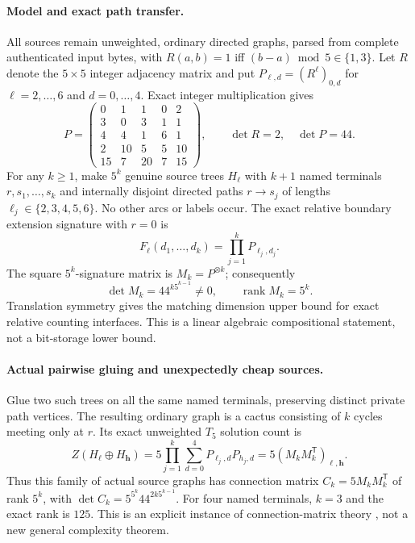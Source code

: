 \documentclass[11pt]{article}
\begin{document}
\paragraph{Model and exact path transfer.}
All sources remain unweighted, ordinary directed graphs, parsed from
complete authenticated input bytes, with
$R(a,b)=1$ iff $(b-a)\bmod5\in\{1,3\}$.
Let $R$ denote the $5\times5$ integer adjacency matrix and put
$P_{\ell,d}=(R^\ell)_{0,d}$ for $\ell=2,\ldots,6$ and
$d=0,\ldots,4$. Exact integer multiplication gives
\[
P=\begin{pmatrix}
0&1&1&0&2\\
3&0&3&1&1\\
4&4&1&6&1\\
2&10&5&5&10\\
15&7&20&7&15
\end{pmatrix},
\qquad \det R=2,\quad\det P=44.
\]
For any $k\ge1$, make $5^k$ genuine source trees $H_{\boldsymbol\ell}$
with $k+1$ named terminals $r,s_1,\ldots,s_k$ and internally
disjoint directed paths $r\to s_j$ of lengths
$\ell_j\in\{2,3,4,5,6\}$. No other arcs or labels occur.
The exact relative boundary extension signature with $r=0$ is
\[
F_{\boldsymbol\ell}(d_1,\ldots,d_k)
=\prod_{j=1}^k P_{\ell_j,d_j}.
\]
The square $5^k$-signature matrix is
$M_k=P^{\otimes k}$; consequently
\[
\det M_k=44^{k5^{k-1}}\ne0,\qquad
\operatorname{rank}M_k=5^k.
\]
Translation symmetry gives the matching dimension upper bound
for exact relative counting interfaces. This is a linear algebraic
compositional statement, not a bit-storage lower bound.

\paragraph{Actual pairwise gluing and unexpectedly cheap sources.}
Glue two such trees on all the same named terminals, preserving
distinct private path vertices. The resulting ordinary graph
is a cactus consisting of $k$ cycles meeting only at $r$. Its
exact unweighted $T_5$ solution count is
\[
Z(H_{\boldsymbol\ell}\oplus H_{\boldsymbol h})
=5\prod_{j=1}^k\sum_{d=0}^4
P_{\ell_j,d}P_{h_j,d}
=5(M_kM_k^{\mathsf T})_{\boldsymbol\ell,\boldsymbol h}.
\]
Thus this family of actual source graphs has connection matrix
$C_k=5M_kM_k^{\mathsf T}$ of rank $5^k$, with
$\det C_k=5^{5^k}44^{2k5^{k-1}}$.
For four named terminals, $k=3$ and the exact rank is $125$.
This is an explicit instance of connection-matrix theory
\cite{lovaszconnection}, not a new general complexity theorem.
\end{document}
